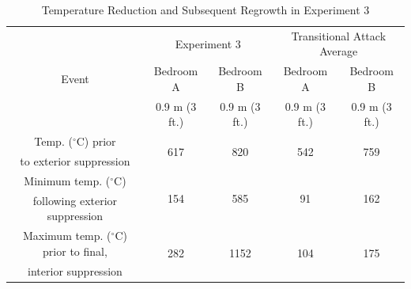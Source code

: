 \documentclass[12pt,oneside]{article}
\begin{document}
\begin{table}[!ht]
    \centering
    \small
    \caption{Temperature Reduction and Subsequent Regrowth in Experiment 3}
    \label{tab:exp_3_temps}
    \begin{tabular}{ccccc}
    \toprule[1.5pt]
 	\multirow{3}{*}{Event} 													& \multicolumn{2}{c}{Experiment 3}						& \multicolumn{2}{c}{Transitional Attack Average}	\\										
 																			&	Bedroom A  				&	Bedroom B				&	Bedroom A 				& Bedroom B	  		\\
 																			&	0.9 m (3 ft.)			&	0.9 m (3 ft.)			&	0.9 m (3 ft.)			& 0.9 m (3 ft.)		\\
 	\midrule 
  	Temp. ($^{\circ}$C) prior 												&	\multirow{2}{*}{617}	&	\multirow{2}{*}{820}	&	\multirow{2}{*}{542}	& \multirow{2}{*}{759}				\\
  	to exterior suppression 												&							&							&							&									\\
  	Minimum temp. ($^{\circ}$C) 											&	\multirow{2}{*}{154}	&	\multirow{2}{*}{585}	&	\multirow{2}{*}{91}		& \multirow{2}{*}{162}				\\
  	following exterior suppression											&							&							&							&									\\
  	Maximum temp. ($^{\circ}$C) prior to final,								&	\multirow{2}{*}{282}	&	\multirow{2}{*}{1152}	&	\multirow{2}{*}{104}	& \multirow{2}{*}{175}				\\
  	 interior suppression													&							&							&							&					\\
 	\bottomrule[1.25pt] 
    \end{tabular}
\end{table}
\end{document}
